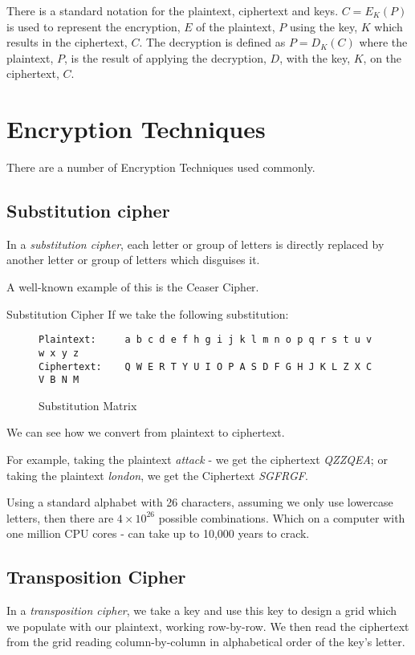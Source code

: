 There is a standard notation for the plaintext, ciphertext and keys. $C=E_K(P)$ is used to represent the encryption, $E$ of the plaintext, $P$ using the key, $K$ which results in the ciphertext, $C$. The decryption is defined as $P=D_K(C)$ where the plaintext, $P$, is the result of applying the decryption, $D$, with the key, $K$, on the ciphertext, $C$. 

\section{Encryption Techniques}
There are a number of Encryption Techniques used commonly.

\subsection{Substitution cipher}
In a \textit{substitution cipher}, each letter or group of letters is directly replaced by another letter or group of letters which disguises it. 

A well-known example of this is the Ceaser Cipher. 

\begin{example}{Substitution Cipher}
If we take the following substitution:

\begin{figure}[H]
\centering
\begin{BVerbatim}
Plaintext:     a b c d e f h g i j k l m n o p q r s t u v w x y z
Ciphertext:    Q W E R T Y U I O P A S D F G H J K L Z X C V B N M
\end{BVerbatim}
\caption{Substitution Matrix}
\end{figure}

We can see how we convert from plaintext to ciphertext.

For example, taking the plaintext \textit{attack} - we get the ciphertext \textit{QZZQEA}; or taking the plaintext \textit{london}, we get the Ciphertext \textit{SGFRGF}. 
\end{example}

Using a standard alphabet with 26 characters, assuming we only use lowercase letters, then there are $4 \times 10^{26}$ possible combinations. Which on a computer with one million CPU cores - can take up to 10,000 years to crack.

\subsection{Transposition Cipher}
In a \textit{transposition cipher}, we take a key and use this key to design a grid which we populate with our plaintext, working row-by-row. We then read the ciphertext from the grid reading column-by-column in alphabetical order of the key's letter.

